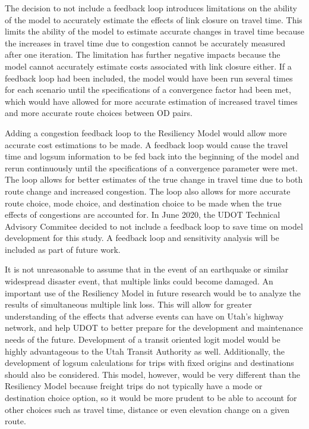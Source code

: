 The decision to not include a feedback loop introduces limitations on the
ability of the model to accurately estimate the effects of link closure on
travel time. This limits the ability of the model to estimate accurate changes in
travel time because the increases in travel time due to congestion cannot be
accurately measured after one iteration. The limitation has further negative
impacts because the model cannot accurately estimate costs associated with link
closure either.
If a feedback loop had been included, the model would have been run several times for each scenario until the specifications of a convergence factor had been met, which would have allowed for more accurate estimation of increased travel times and more accurate route choices between OD pairs.

Adding a congestion feedback loop to the Resiliency Model would allow more
accurate cost estimations to be made. A feedback loop would cause the
travel time and logsum information to be fed back into the beginning of the
model and rerun continuously until the specifications of a convergence
parameter were met. The loop allows for better estimates of the true change
in travel time due to both route change and increased congestion. The loop
also allows for more accurate route choice, mode choice, and destination
choice to be made when the true effects of congestions are accounted for.
In June 2020, the UDOT Technical Advisory Commitee decided to not include a feedback loop to save time
on model development for this study. A feedback loop and sensitivity analysis
will be included as part of future work.

It is not unreasonable to assume that in the event of an earthquake or
similar widespread disaster event, that multiple links could become
damaged. An important use of the Resiliency Model in future research would be to analyze the results of simultaneous multiple link
loss. This will allow for
greater understanding of the effects that adverse events can have on Utah’s
highway network, and help UDOT to better prepare for the development and
maintenance needs of the future. Development of a transit oriented logit model
would be highly advantageous to the Utah Transit Authority as well.
Additionally, the development of logsum calculations for trips with fixed
origins and destinations should also be considered. This model, however,
would be very different than the Resiliency Model because freight trips
do not typically have a mode or destination choice option, so it would be
more prudent to be able to account for other choices such as travel time,
distance or even elevation change on a given route.

